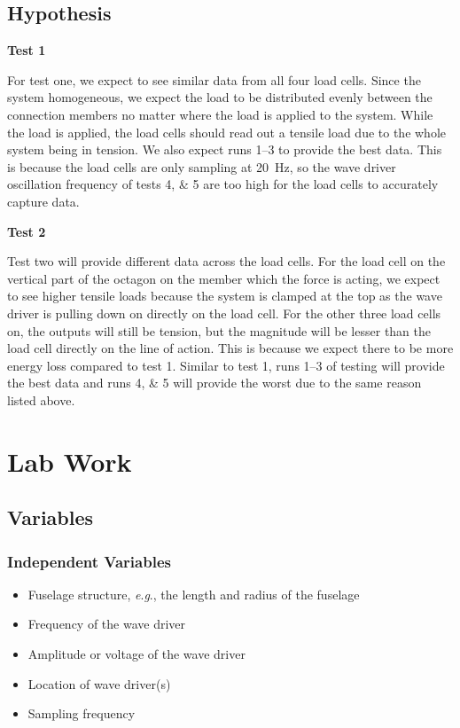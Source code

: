 \documentclass[12 pt]{report}
\newcommand{\eg}{\textit{e}.\textit{g}., }
\begin{document}
\section{Hypothesis} \label{hypothesis}
\textbf{Test 1}

For test one, we expect to see similar data from all four load cells. Since the system homogeneous, we expect the load to be distributed evenly between the connection members no matter where the load is applied to the system. While the load is applied, the load cells should read out a tensile load due to the whole system being in tension. We also expect runs \numrange{1}{3} to provide the best data. This is because the load cells are only sampling at \qty{20}{\hertz}, so the wave driver oscillation frequency of tests \numlist{4;5} are too high for the load cells to accurately capture data.  

\textbf{Test 2}

Test two will provide different data across the load cells. For the load cell on the vertical part of the octagon on the member which the force is acting, we expect to see higher tensile loads because the system is clamped at the top as the wave driver is pulling down on directly on the load cell. For the other three load cells on, the outputs will still be tension, but the magnitude will be lesser than the load cell directly on the line of action. This is because we expect there to be more energy loss compared to test \num{1}. Similar to test \num{1}, runs \numrange{1}{3} of testing will provide the best data and runs \numlist{4;5} will provide the worst due to the same reason listed above.  

\chapter{Lab Work} \label{lab_work}
\section{Variables} \label{variables}
\subsection{Independent Variables} \label{variables-independent_variables}
\begin{itemize}
	\item Fuselage structure, \eg the length and radius of the fuselage
	\item Frequency of the wave driver
	\item Amplitude or voltage of the wave driver
	\item Location of wave driver(s)
	\item Sampling frequency
\end{itemize}
\end{document}
